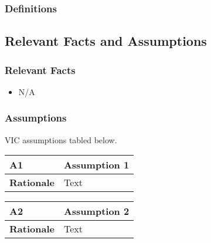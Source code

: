 \documentclass [11pt]{article}
\begin{document}
\subsubsection{Definitions}

\subsection{Relevant Facts and Assumptions} 

\subsubsection{Relevant Facts}
\begin{itemize}
	\item N/A
\end{itemize}

\subsubsection{Assumptions}
VIC assumptions tabled below. 
\begin{longtable}{| p{ } | p{ } | }\hline 
\rowcolor{tableCell}\textbf{A1} & Assumption 1 \\ \hline
\textbf{Rationale} & Text \\ \hline 
\end{longtable}

\begin{longtable}{| p{ } | p{ } | }\hline 
\rowcolor{tableCell}\textbf{A2} & Assumption 2 \\ \hline
\textbf{Rationale} &  Text\\ \hline
\end{longtable}
\end{document}
